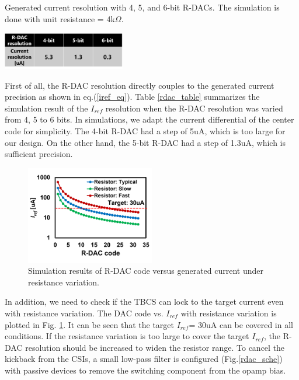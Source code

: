 \documentclass[paper]{ieice}
\begin{document}
\begin{table}[]
\centering
\caption{Generated current resolution with 4, 5, and 6-bit R-DACs. The simulation is done with unit resistance = 4k$\Omega$.}
 \includegraphics[width=0.4\textwidth]{figs/rdac_table.png}
  
\label{rdac_table}
\end{table}

First of all, the R-DAC resolution directly couples to the generated current precision as shown in eq.(\ref{iref_eq}). Table \ref{rdac_table} summarizes the simulation result of the $I_{ref}$ resolution when the R-DAC resolution was varied from 4, 5 to 6 bits. In simulations, we adapt the current differential of the center code for simplicity. The 4-bit R-DAC had a step of 5uA, which is too large for our design. On the other hand, the 5-bit R-DAC had a step of 1.3uA, which is sufficient precision.

\begin{figure}[!t]
\centering
 \includegraphics[width=0.5\textwidth]{figs/rdaccode.png}
  \caption{Simulation results of R-DAC code versus generated current under resistance variation.}
\label{rdac_pvt}
\end{figure}

In addition, we need to check if the TBCS can lock to the target current even with resistance variation. The DAC code vs. $I_{ref}$ with resistance variation is plotted in Fig. \ref{rdac_pvt}. It can be seen that the target $I_{ref}$= 30uA can be covered in all conditions. If the resistance variation is too large to cover the target $I_{ref}$, the R-DAC resolution should be increased to widen the resistor range.
To cancel the kickback from the CSIs, a small low-pass filter is configured (Fig.\ref{rdac_sche}) with passive devices to remove the switching component from the opamp bias.
\end{document}
